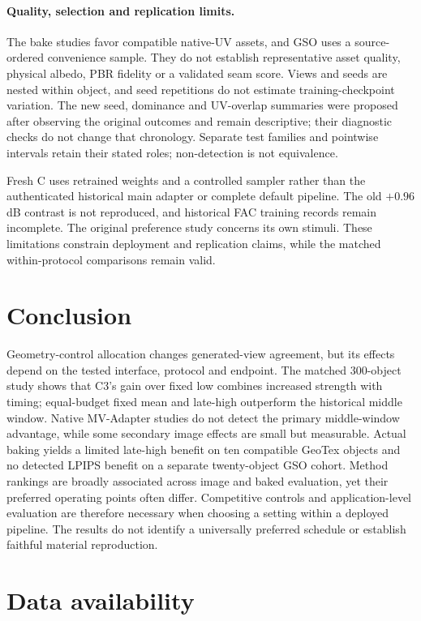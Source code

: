 \documentclass[times,twocolumn,final]{elsarticle}
\begin{document}
\paragraph{Quality, selection and replication limits.}
The bake studies favor compatible native-UV assets, and GSO uses a source-ordered convenience sample. They do not establish representative asset quality, physical albedo, PBR fidelity or a validated seam score. Views and seeds are nested within object, and seed repetitions do not estimate training-checkpoint variation. The new seed, dominance and UV-overlap summaries were proposed after observing the original outcomes and remain descriptive; their diagnostic checks do not change that chronology. Separate test families and pointwise intervals retain their stated roles; non-detection is not equivalence.

Fresh C uses retrained weights and a controlled sampler rather than the authenticated historical main adapter or complete default pipeline. The old $+0.96$ dB contrast is not reproduced, and historical FAC training records remain incomplete. The original preference study concerns its own stimuli. These limitations constrain deployment and replication claims, while the matched within-protocol comparisons remain valid.

\section{Conclusion}
\label{sec:conclusion}

Geometry-control allocation changes generated-view agreement, but its effects depend on the tested interface, protocol and endpoint. The matched 300-object study shows that C3's gain over fixed low combines increased strength with timing; equal-budget fixed mean and late-high outperform the historical middle window. Native MV-Adapter studies do not detect the primary middle-window advantage, while some secondary image effects are small but measurable. Actual baking yields a limited late-high benefit on ten compatible GeoTex objects and no detected LPIPS benefit on a separate twenty-object GSO cohort. Method rankings are broadly associated across image and baked evaluation, yet their preferred operating points often differ. Competitive controls and application-level evaluation are therefore necessary when choosing a setting within a deployed pipeline. The results do not identify a universally preferred schedule or establish faithful material reproduction.

\section*{Data availability}
\end{document}
